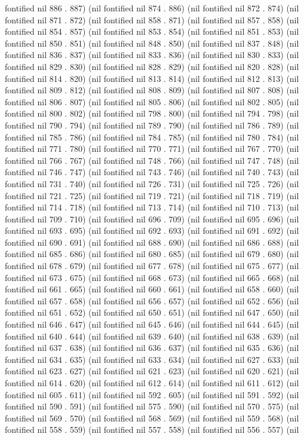 fontified nil 886 . 887) (nil fontified nil 874 . 886) (nil fontified nil 872 . 874) (nil fontified nil 871 . 872) (nil fontified nil 858 . 871) (nil fontified nil 857 . 858) (nil fontified nil 854 . 857) (nil fontified nil 853 . 854) (nil fontified nil 851 . 853) (nil fontified nil 850 . 851) (nil fontified nil 848 . 850) (nil fontified nil 837 . 848) (nil fontified nil 836 . 837) (nil fontified nil 833 . 836) (nil fontified nil 830 . 833) (nil fontified nil 829 . 830) (nil fontified nil 828 . 829) (nil fontified nil 820 . 828) (nil fontified nil 814 . 820) (nil fontified nil 813 . 814) (nil fontified nil 812 . 813) (nil fontified nil 809 . 812) (nil fontified nil 808 . 809) (nil fontified nil 807 . 808) (nil fontified nil 806 . 807) (nil fontified nil 805 . 806) (nil fontified nil 802 . 805) (nil fontified nil 800 . 802) (nil fontified nil 798 . 800) (nil fontified nil 794 . 798) (nil fontified nil 790 . 794) (nil fontified nil 789 . 790) (nil fontified nil 786 . 789) (nil fontified nil 785 . 786) (nil fontified nil 784 . 785) (nil fontified nil 780 . 784) (nil fontified nil 771 . 780) (nil fontified nil 770 . 771) (nil fontified nil 767 . 770) (nil fontified nil 766 . 767) (nil fontified nil 748 . 766) (nil fontified nil 747 . 748) (nil fontified nil 746 . 747) (nil fontified nil 743 . 746) (nil fontified nil 740 . 743) (nil fontified nil 731 . 740) (nil fontified nil 726 . 731) (nil fontified nil 725 . 726) (nil fontified nil 721 . 725) (nil fontified nil 719 . 721) (nil fontified nil 718 . 719) (nil fontified nil 714 . 718) (nil fontified nil 713 . 714) (nil fontified nil 710 . 713) (nil fontified nil 709 . 710) (nil fontified nil 696 . 709) (nil fontified nil 695 . 696) (nil fontified nil 693 . 695) (nil fontified nil 692 . 693) (nil fontified nil 691 . 692) (nil fontified nil 690 . 691) (nil fontified nil 688 . 690) (nil fontified nil 686 . 688) (nil fontified nil 685 . 686) (nil fontified nil 680 . 685) (nil fontified nil 679 . 680) (nil fontified nil 678 . 679) (nil fontified nil 677 . 678) (nil fontified nil 675 . 677) (nil fontified nil 673 . 675) (nil fontified nil 668 . 673) (nil fontified nil 665 . 668) (nil fontified nil 661 . 665) (nil fontified nil 660 . 661) (nil fontified nil 658 . 660) (nil fontified nil 657 . 658) (nil fontified nil 656 . 657) (nil fontified nil 652 . 656) (nil fontified nil 651 . 652) (nil fontified nil 650 . 651) (nil fontified nil 647 . 650) (nil fontified nil 646 . 647) (nil fontified nil 645 . 646) (nil fontified nil 644 . 645) (nil fontified nil 640 . 644) (nil fontified nil 639 . 640) (nil fontified nil 638 . 639) (nil fontified nil 637 . 638) (nil fontified nil 636 . 637) (nil fontified nil 635 . 636) (nil fontified nil 634 . 635) (nil fontified nil 633 . 634) (nil fontified nil 627 . 633) (nil fontified nil 623 . 627) (nil fontified nil 621 . 623) (nil fontified nil 620 . 621) (nil fontified nil 614 . 620) (nil fontified nil 612 . 614) (nil fontified nil 611 . 612) (nil fontified nil 605 . 611) (nil fontified nil 592 . 605) (nil fontified nil 591 . 592) (nil fontified nil 590 . 591) (nil fontified nil 575 . 590) (nil fontified nil 570 . 575) (nil fontified nil 569 . 570) (nil fontified nil 568 . 569) (nil fontified nil 559 . 568) (nil fontified nil 558 . 559) (nil fontified nil 557 . 558) (nil fontified nil 556 . 557) (nil 